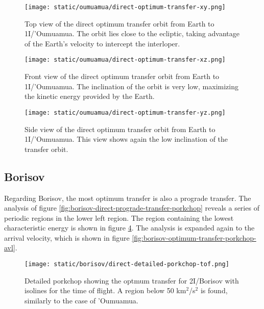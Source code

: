 \begin{figure}[H]
  \centering
  \texttt{[image: static/oumuamua/direct-optimum-transfer-xy.png]}
  \caption[Top view of the direct optimum transfer orbit from Earth to 1I/'Oumuamua]{
    Top view of the direct optimum transfer orbit from Earth to 1I/'Oumuamua.
    The orbit lies close to the ecliptic, taking advantage of the Earth's
    velocity to intercept the interloper.
  }
  \label{fig:optimum_oumuamua_orbit_xy}
\end{figure}

\begin{figure}[H]
  \centering
  \texttt{[image: static/oumuamua/direct-optimum-transfer-xz.png]}
  \caption[Front view of the direct optimum transfer orbit from Earth to 1I/'Oumuamua]{
    Front view of the direct optimum transfer orbit from Earth to 1I/'Oumuamua.
    The inclination of the orbit is very low, maximizing the kinetic energy
    provided by the Earth.
  }
  \label{fig:optimum_oumuamua_orbit_yz}
\end{figure}

\begin{figure}[H]
  \centering
  \texttt{[image: static/oumuamua/direct-optimum-transfer-yz.png]}
  \caption[Side view of the direct optimum transfer orbit from Earth to 1I/'Oumuamua]{
    Side view of the direct optimum transfer orbit from Earth to 1I/'Oumuamua.
    This view shows again the low inclination of the transfer orbit.}
  \label{fig:optimum_oumuamua_orbit_xz}
\end{figure}

\subsection{Borisov}

Regarding Borisov, the most optimum transfer is also a prograde transfer. The
analysis of figure \ref{fig:borisov-direct-prograde-transfer-porkchop} reveals a
series of periodic regions in the lower left region. The region containing the
lowest characteristic energy is shown in figure
\ref{fig:borisov-optimum-transfer-porkchop-tof}. The analysis is expanded again
to the arrival velocity, which is shown in figure
\ref{fig:borisov-optimum-transfer-porkchop-avl}.

\begin{figure}[H]
  \centering
  \texttt{[image: static/borisov/direct-detailed-porkchop-tof.png]}
  \caption[Detailed porkchop showing the optimum transfer for
    2I/Borisov with the time of flight.]{Detailed porkchop showing the
    optmum transfer for 2I/Borisov with isolines for the time of flight. A
    region below 50 km$^2$/s$^2$ is found, similarly to the case of
    'Oumuamua.}
  \label{fig:borisov-optimum-transfer-porkchop-tof}
\end{figure}

